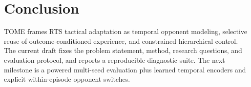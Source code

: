 \documentclass[11pt]{article}
\begin{document}
\section{Conclusion}

TOME frames RTS tactical adaptation as temporal opponent modeling, selective
reuse of outcome-conditioned experience, and constrained hierarchical control.
The current draft fixes the problem statement, method, research questions, and
evaluation protocol, and reports a reproducible diagnostic suite. The next
milestone is a powered multi-seed evaluation plus learned temporal encoders and
explicit within-episode opponent switches.



\end{document}
